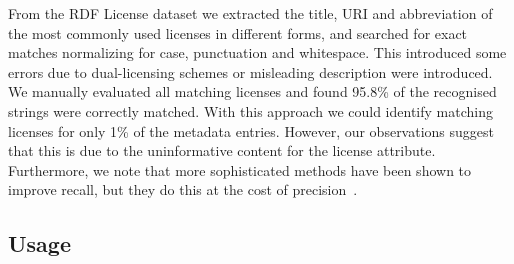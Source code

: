 \documentclass[11pt]{article}
\begin{document}
From the RDF License dataset \cite{rdflicense} we extracted the  title, URI and
abbreviation of the most
commonly used licenses in different forms, and searched for exact matches
normalizing for case, punctuation and whitespace. This introduced some errors due to
dual-licensing schemes or misleading description were introduced.
We manually evaluated all matching licenses and found 95.8\% of the
recognised strings were correctly matched. %
With this approach we could identify matching licenses for only 1\% of the
metadata entries. However, 
our observations suggest that this is due to the uninformative content for the
license attribute. Furthermore, we note that more sophisticated
methods have been shown to improve recall, but they do this at the cost of
precision~\cite{cabrio2014these}.


\subsection{Usage}
\end{document}
